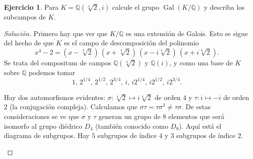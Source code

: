 \documentclass{article}
\newcounter{tarea}
\theoremstyle{definition}
\newtheorem{ejercicio}{Ejercicio}[tarea]
\newenvironment{solucion}{\begin{proof}[Solución]}{\end{proof}}
\DeclareMathOperator{\Gal}{Gal}
\newcommand{\QQ}{\mathbb{Q}}
\begin{document}
\begin{ejercicio}
  Para $K = \QQ (\sqrt[4]{2},i)$ calcule el grupo $\Gal (K/\QQ)$ y describa
  los subcampos de $K$.

  \ifdefined\solutions
  \begin{solucion}
    Primero hay que ver que $K/\QQ$ es una extensión de Galois. Esto se sigue
    del hecho de que $K$ es el campo de descomposición del polinomio
    $$x^4 - 2 = (x - \sqrt[4]{2})\,(x + \sqrt[4]{2})\,(x - i\sqrt[4]{2})\,(x + i\sqrt[4]{2}).$$
    Se trata del compositum de campos $\QQ (\sqrt[4]{2})$ y $\QQ (i)$,
    y como una base de $K$ sobre $\QQ$ podemos tomar
    \[ 1, \, 2^{1/4}, \, 2^{1/2}, \, 2^{3/4}, \,
       i, \, i2^{1/4}, \, i2^{1/2}, \, i2^{3/4}. \]

    Hay dos automorfismos evidentes:
    $\sigma\colon \sqrt[4]{2} \mapsto i\sqrt[4]{2}$ de orden $4$
    y $\tau\colon i \mapsto -i$ de orden $2$
    (la conjugación compleja). Calculamos que
    $\sigma\tau = \tau\sigma^3 \ne \tau\sigma$. De estas consideraciones se ve
    que $\sigma$ y $\tau$ generan un grupo de $8$ elementos que será isomorfo al
    grupo diédrico $D_4$ (también conocido como $D_8$).  Aquí está el diagrama
    de subgrupos. Hay $5$ subgrupos de índice $4$ y $3$ subgrupos de índice $2$.

    \begin{center}
\end{center}
\end{solucion}
\end{ejercicio}
\end{document}
